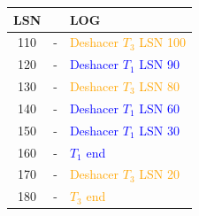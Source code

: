 \documentclass{templateNote}
\begin{document}
\begin{enumerate}
    \begin{figure}[H]
        \centering
        \begin{tabular}{|c|c|l|}
            \hline
            \textbf{LSN} & & \textbf{LOG} \\ \hline
            110 & - & \textcolor{orange}{Deshacer $T_3$ LSN 100} \\
            120 & - & \textcolor{blue}{Deshacer $T_1$ LSN 90} \\
            130 & - & \textcolor{orange}{Deshacer $T_3$ LSN 80} \\
            140 & - & \textcolor{blue}{Deshacer $T_1$ LSN 60} \\
            150 & - & \textcolor{blue}{Deshacer $T_1$ LSN 30} \\
            160 & - & \textcolor{blue}{$T_1$ end} \\
            170 & - & \textcolor{orange}{Deshacer $T_3$ LSN 20} \\
            180 & - & \textcolor{orange}{$T_3$ end} \\ \hline
        \end{tabular}   
    \end{figure}
\end{enumerate}
\end{document}

